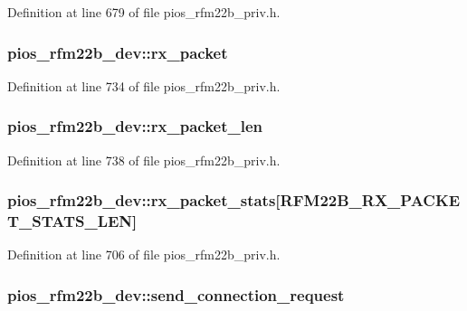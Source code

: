 Definition at line 679 of file pios\-\_\-rfm22b\-\_\-priv.\-h.

\hypertarget{structpios__rfm22b__dev_a6c8fb7a4ca0874d372ec084d2089f43c}{
\subsubsection[{rx\-\_\-packet}]{ pios\-\_\-rfm22b\-\_\-dev\-::rx\-\_\-packet}}\label{structpios__rfm22b__dev_a6c8fb7a4ca0874d372ec084d2089f43c}


Definition at line 734 of file pios\-\_\-rfm22b\-\_\-priv.\-h.

\hypertarget{structpios__rfm22b__dev_acf4806b2fb1db624e1fa47dad08ba447}{
\subsubsection[{rx\-\_\-packet\-\_\-len}]{ pios\-\_\-rfm22b\-\_\-dev\-::rx\-\_\-packet\-\_\-len}}\label{structpios__rfm22b__dev_acf4806b2fb1db624e1fa47dad08ba447}


Definition at line 738 of file pios\-\_\-rfm22b\-\_\-priv.\-h.

\hypertarget{structpios__rfm22b__dev_acae5126a75716a87ed65f6d354df1d6a}{
\subsubsection[{rx\-\_\-packet\-\_\-stats}]{ pios\-\_\-rfm22b\-\_\-dev\-::rx\-\_\-packet\-\_\-stats\mbox{[}R\-F\-M22\-B\-\_\-\-R\-X\-\_\-\-P\-A\-C\-K\-E\-T\-\_\-\-S\-T\-A\-T\-S\-\_\-\-L\-E\-N\mbox{]}}}\label{structpios__rfm22b__dev_acae5126a75716a87ed65f6d354df1d6a}


Definition at line 706 of file pios\-\_\-rfm22b\-\_\-priv.\-h.

\hypertarget{structpios__rfm22b__dev_afd7377cf7b2ada828b83887653e4d3c2}{
\subsubsection[{send\-\_\-connection\-\_\-request}]{ pios\-\_\-rfm22b\-\_\-dev\-::send\-\_\-connection\-\_\-request}}\label{structpios__rfm22b__dev_afd7377cf7b2ada828b83887653e4d3c2}


